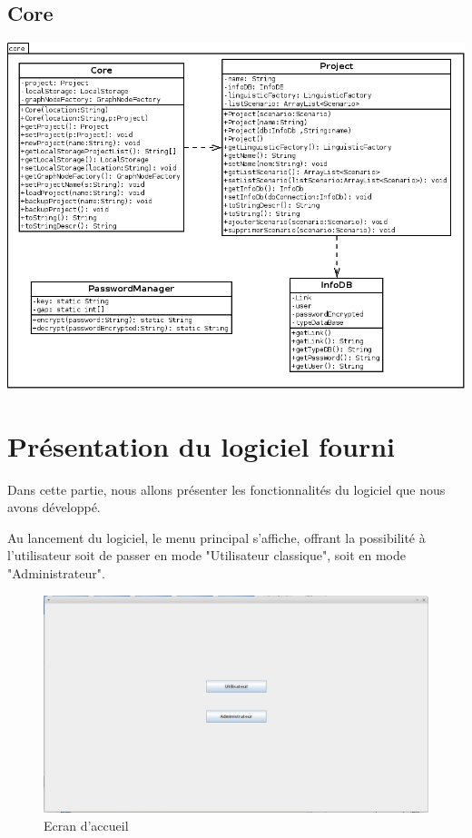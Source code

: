 \documentclass[12pt]{report}
\begin{document}
\section{Core}


\begin{center}
\includegraphics[scale=0.5]{diversuml/Core.png}
\end{center}


\chapter{Présentation du logiciel fourni}

Dans cette partie, nous allons présenter les fonctionnalités du logiciel que nous avons développé.

Au lancement du logiciel, le menu principal s'affiche, offrant la possibilité à l'utilisateur soit de passer en mode "Utilisateur classique", soit en mode "Administrateur". \bigskip 

\begin{figure}[h!]
\centering
\includegraphics[scale=0.3]{IHM/accueil.png}
\caption{Ecran d'accueil}
\end{figure}
\end{document}
